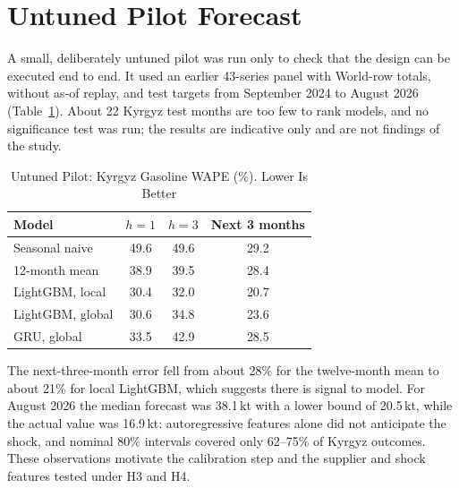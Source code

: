 \documentclass[conference]{IEEEtran}
\begin{document}
\section{Untuned Pilot Forecast}\label{app:pilot}
A small, deliberately untuned pilot was run only to check that the design can be executed end to end. It used an earlier 43-series panel with World-row totals, without as-of replay, and test targets from September 2024 to August 2026 (Table~\ref{tab:pilot}). About 22 Kyrgyz test months are too few to rank models, and no significance test was run; the results are indicative only and are not findings of the study.

\begin{table}[t]
\caption{Untuned Pilot: Kyrgyz Gasoline WAPE (\%). Lower Is Better}
\label{tab:pilot}
\centering
\footnotesize
\begin{tabular}{@{}lccc@{}}
\toprule
Model & $h=1$ & $h=3$ & Next 3 months \\
\midrule
Seasonal naive & 49.6 & 49.6 & 29.2 \\
12-month mean & 38.9 & 39.5 & 28.4 \\
LightGBM, local & 30.4 & 32.0 & 20.7 \\
LightGBM, global & 30.6 & 34.8 & 23.6 \\
GRU, global & 33.5 & 42.9 & 28.5 \\
\bottomrule
\end{tabular}
\end{table}

The next-three-month error fell from about 28\% for the twelve-month mean to about 21\% for local LightGBM, which suggests there is signal to model. For August 2026 the median forecast was 38.1\,kt with a lower bound of 20.5\,kt, while the actual value was 16.9\,kt: autoregressive features alone did not anticipate the shock, and nominal 80\% intervals covered only 62--75\% of Kyrgyz outcomes. These observations motivate the calibration step and the supplier and shock features tested under H3 and H4.

\FloatBarrier


\end{document}
